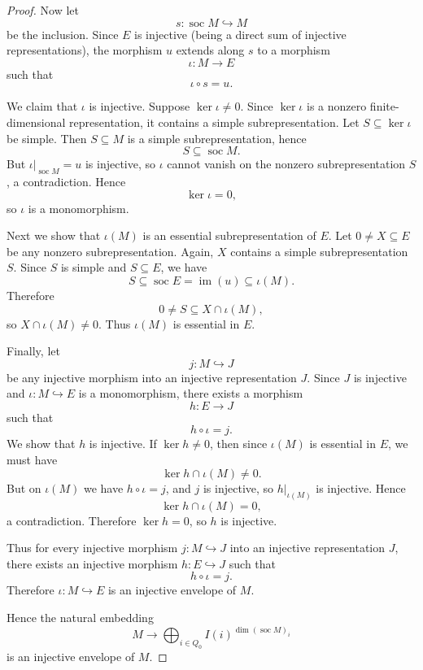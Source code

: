 \documentclass[11pt, a4paper]{article}
\begin{document}
\begin{enumerate}[leftmargin=*, label=\textbf{\arabic*.}]
\begin{proof}
    Now let
    \[
    s\colon \operatorname{soc}M \hookrightarrow M
    \]
    be the inclusion. Since $E$ is injective (being a direct sum of injective representations),
    the morphism $u$ extends along $s$ to a morphism
    \[
    \iota\colon M \longrightarrow E
    \]
    such that
    \[
    \iota\circ s=u.
    \]
    
    We claim that $\iota$ is injective. Suppose $\ker\iota\neq 0$. Since $\ker\iota$ is a
    nonzero finite-dimensional representation, it contains a simple subrepresentation. Let $S\subseteq \ker\iota$ be simple. Then $S\subseteq M$ is a
    simple subrepresentation, hence
    \[
    S\subseteq \operatorname{soc}M.
    \]
    But $\iota|_{\operatorname{soc}M}=u$ is injective, so $\iota$ cannot vanish on the
    nonzero subrepresentation $S$, a contradiction. Hence
    \[
    \ker\iota=0,
    \]
    so $\iota$ is a monomorphism.
    
    Next we show that $\iota(M)$ is an essential subrepresentation of $E$. Let
    $0\neq X\subseteq E$ be any nonzero subrepresentation. Again,
    $X$ contains a simple subrepresentation $S$. Since $S$ is simple and $S\subseteq E$,
    we have
    \[
    S\subseteq \operatorname{soc}E=\operatorname{im}(u)\subseteq \iota(M).
    \]
    Therefore
    \[
    0\neq S\subseteq X\cap \iota(M),
    \]
    so $X\cap \iota(M)\neq 0$. Thus $\iota(M)$ is essential in $E$.
    
    Finally, let
    \[
    j\colon M \hookrightarrow J
    \]
    be any injective morphism into an injective representation $J$. Since $J$ is injective
    and $\iota\colon M\hookrightarrow E$ is a monomorphism, there exists a morphism
    \[
    h\colon E\longrightarrow J
    \]
    such that
    \[
    h\circ \iota=j.
    \]
    We show that $h$ is injective. If $\ker h\neq 0$, then since $\iota(M)$ is essential in
    $E$, we must have
    \[
    \ker h\cap \iota(M)\neq 0.
    \]
    But on $\iota(M)$ we have $h\circ \iota=j$, and $j$ is injective, so
    $h|_{\iota(M)}$ is injective. Hence
    \[
    \ker h\cap \iota(M)=0,
    \]
    a contradiction. Therefore $\ker h=0$, so $h$ is injective.
    
    Thus for every injective morphism $j\colon M\hookrightarrow J$ into an injective
    representation $J$, there exists an injective morphism $h\colon E\hookrightarrow J$
    such that
    \[
    h\circ \iota=j.
    \]
    Therefore $\iota\colon M\hookrightarrow E$ is an injective envelope of $M$.
    
    Hence the natural embedding
    \[
    M \longrightarrow \bigoplus_{i\in Q_0} I(i)^{\dim(\operatorname{soc}M)_i}
    \]
    is an injective envelope of $M$.
    \end{proof}


\end{enumerate}
\end{document}
